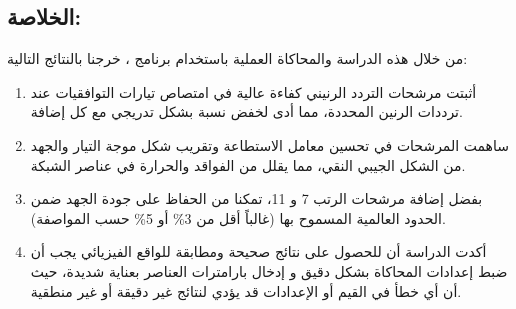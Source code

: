 \subsection{الخلاصة:}

من خلال هذه الدراسة والمحاكاة العملية باستخدام برنامج ، خرجنا بالنتائج التالية:

\begin{enumerate}
    \item أثبتت مرشحات التردد الرنيني  كفاءة عالية في امتصاص تيارات التوافقيات عند ترددات الرنين المحددة، مما أدى لخفض نسبة  بشكل تدريجي مع كل إضافة.
    \item ساهمت المرشحات في تحسين معامل الاستطاعة وتقريب شكل موجة التيار والجهد من الشكل الجيبي النقي، مما يقلل من الفواقد والحرارة في عناصر الشبكة.
    \item بفضل إضافة مرشحات الرتب 7 و 11، تمكنا من الحفاظ على جودة الجهد ضمن الحدود العالمية المسموح بها (غالباً أقل من 3\% أو 5\% حسب المواصفة).
    \item أكدت الدراسة أن للحصول على نتائج صحيحة ومطابقة للواقع الفيزيائي يجب أن ضبط إعدادات المحاكاة بشكل دقيق و إدخال بارامترات العناصر بعناية شديدة، حيث أن أي خطأ في القيم أو الإعدادات قد يؤدي لنتائج غير دقيقة أو غير منطقية.
\end{enumerate}
